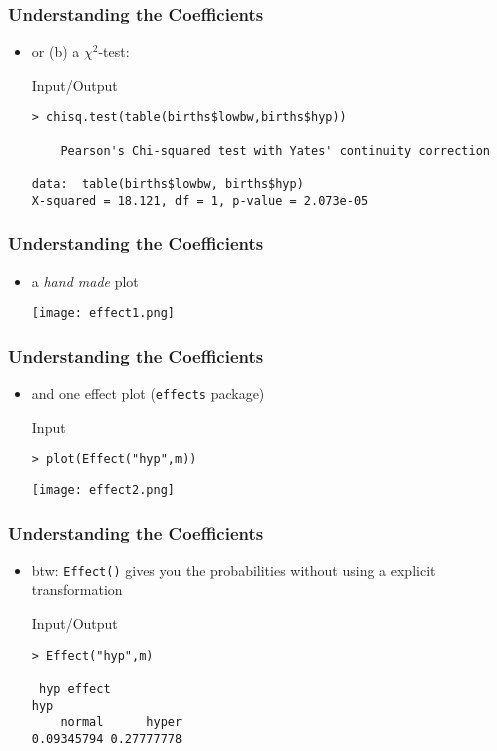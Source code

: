 \begin{frame}[fragile]\frametitle{Understanding the Coefficients}
\begin{itemize}
\item or (b) a $\chi^2$-test:\small
  \begin{exampleblock}{Input/Output}\footnotesize
\begin{verbatim}
> chisq.test(table(births$lowbw,births$hyp))

	Pearson's Chi-squared test with Yates' continuity correction

data:  table(births$lowbw, births$hyp)
X-squared = 18.121, df = 1, p-value = 2.073e-05
\end{verbatim}
  \end{exampleblock}
\end{itemize}
\end{frame}

\begin{frame}[fragile]\frametitle{Understanding the Coefficients}
\begin{itemize}
\item a \emph{hand made} plot
\begin{center}
\texttt{[image: effect1.png]}
\end{center}
\end{itemize}
\end{frame}

\begin{frame}[fragile]\frametitle{Understanding the Coefficients}
\begin{itemize}
\item and one effect plot (\texttt{effects} package)
  \begin{exampleblock}{Input}
\begin{verbatim}
> plot(Effect("hyp",m))
\end{verbatim}
  \end{exampleblock}
\begin{center}
\texttt{[image: effect2.png]}
\end{center}
\end{itemize}
\end{frame}


\begin{frame}[fragile]\frametitle{Understanding the Coefficients}
\begin{itemize}
\item btw: \texttt{Effect()} gives you the probabilities without using a explicit transformation
  \begin{exampleblock}{Input/Output}
\begin{verbatim}
> Effect("hyp",m)

 hyp effect
hyp
    normal      hyper 
0.09345794 0.27777778 
\end{verbatim}
  \end{exampleblock}
\end{itemize}
\end{frame}


